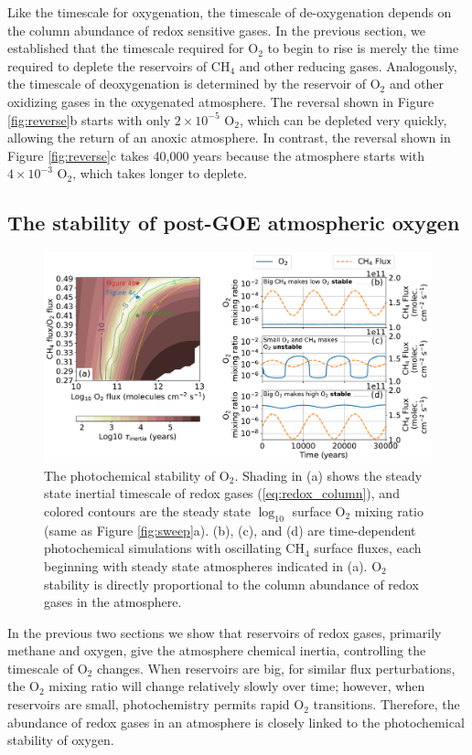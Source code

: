 \documentclass[9pt,twocolumn,twoside,lineno]{pnas-new}
\begin{document}
Like the timescale for oxygenation, the timescale of de-oxygenation depends on the column abundance of redox sensitive gases. In the previous section, we established that the timescale required for O$_2$ to begin to rise is merely the time required to deplete the reservoirs of CH$_4$ and other reducing gases. Analogously, the timescale of deoxygenation is determined by the reservoir of O$_2$ and other oxidizing gases in the oxygenated atmosphere. The reversal shown in Figure \ref{fig:reverse}b starts with only $2 \times 10^{-5}$ O$_2$, which can be depleted very quickly, allowing the return of an anoxic atmosphere. In contrast, the reversal shown in Figure \ref{fig:reverse}c takes 40,000 years because the atmosphere starts with $4 \times 10^{-3}$ O$_2$, which takes longer to deplete. 

\subsection*{The stability of post-GOE atmospheric oxygen} \label{sec:stability}

\begin{figure}
    \centering
    \includegraphics[width=\textwidth]{Stability.pdf}
    \caption{The photochemical stability of O$_2$. Shading in (a) shows the steady state inertial timescale of redox gases (\eqref{eq:redox_column}), and colored contours are the steady state $\log_{10}$ surface O$_2$ mixing ratio (same as Figure \ref{fig:sweep}a). (b), (c), and (d) are time-dependent photochemical simulations with oscillating CH$_4$ surface fluxes, each beginning with steady state atmospheres indicated in (a). O$_2$ stability is directly proportional to the column abundance of redox gases in the atmosphere.}
    \label{fig:stability}
\end{figure}

In the previous two sections we show that reservoirs of redox gases, primarily methane and oxygen, give the atmosphere chemical inertia, controlling the timescale of O$_2$ changes. When reservoirs are big, for similar flux perturbations, the O$_2$ mixing ratio will change relatively slowly over time; however, when reservoirs are small, photochemistry permits rapid O$_2$ transitions. Therefore, the abundance of redox gases in an atmosphere is closely linked to the photochemical stability of oxygen.
\end{document}
